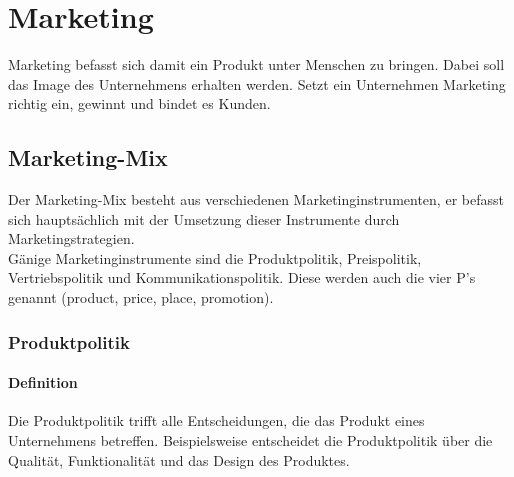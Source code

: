 \chapter{Marketing}
\begin{flushleft}
    Marketing befasst sich damit ein Produkt unter Menschen zu bringen.
    Dabei soll das Image des Unternehmens erhalten werden.
    Setzt ein Unternehmen Marketing richtig ein, gewinnt und bindet es Kunden.
\end{flushleft}

\section{Marketing-Mix}
\begin{flushleft}
    Der Marketing-Mix besteht aus verschiedenen Marketinginstrumenten, er befasst 
    sich hauptsächlich mit der Umsetzung dieser Instrumente durch Marketingstrategien. \\
    Gänige Marketinginstrumente sind die Produktpolitik, Preispolitik, Vertriebspolitik
    und Kommunikationspolitik. Diese werden auch die vier P's genannt
    (product, price, place, promotion).
\end{flushleft}

\subsection{Produktpolitik}
\subsubsection{Definition}
\begin{flushleft}
    Die Produktpolitik trifft alle Entscheidungen, die das Produkt eines Unternehmens betreffen.
    Beispielsweise entscheidet die Produktpolitik über die Qualität, Funktionalität und das Design
    des Produktes.
\end{flushleft}

